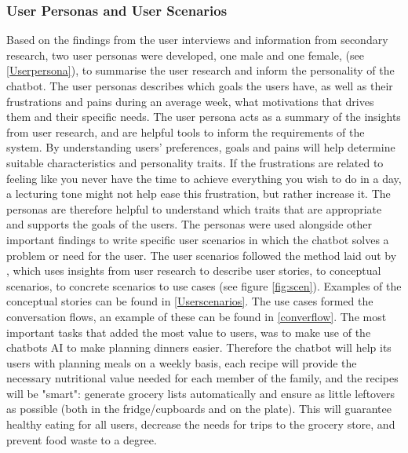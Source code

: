     \subsubsection{User Personas and User Scenarios}
        \label{persscen}
    Based on the findings from the user interviews and information from secondary research, two user personas were developed, one male and one female, (see \ref{Userpersona}), to summarise the user research and inform the personality of the chatbot. The user personas describes which goals the users have, as well as their frustrations and pains during an average week, what motivations that drives them and their specific needs. The user persona acts as a summary of the insights from user research, and are helpful tools to inform the requirements of the system. By understanding users' preferences, goals and pains will help determine suitable characteristics and personality traits. If the frustrations are related to feeling like you never have the time to achieve everything you wish to do in a day, a lecturing tone might not help ease this frustration, but rather increase it. The personas are therefore helpful to understand which traits that are appropriate and supports the goals of the users. The personas were used alongside other important findings to write specific user scenarios in which the chatbot solves a problem or need for the user. The user scenarios followed the method laid out by \cite{Benyon2014}, which uses insights from user research to describe user stories, to conceptual scenarios, to concrete scenarios to use cases (see figure \ref{fig:scen}). Examples of the conceptual stories can be found in \ref{Userscenarios}. The use cases formed the conversation flows, an example of these can be found in \ref{converflow}. The most important tasks that added the most value to users, was to make use of the chatbots AI to make planning dinners easier. Therefore the chatbot will help its users with planning meals on a weekly basis, each recipe will provide the necessary nutritional value needed for each member of the family, and the recipes will be "smart": generate grocery lists automatically and ensure as little leftovers as possible (both in the fridge/cupboards and on the plate). This will guarantee healthy eating for all users, decrease the needs for trips to the grocery store, and prevent food waste to a degree.
    

